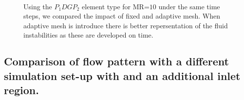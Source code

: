\documentclass[preprint,authoryear,12pt]{elsarticle}
\begin{document}
\begin{figure}
\centering
{}\\[2mm]%
%
\caption{Using the $P_{1}DGP_{2}$ element type for MR=$10$ under the same time steps, we compared the impact of fixed and adaptive mesh. When adaptive mesh is introduce there is better repersentation of the fluid instabilities as these are developed on time.}
\label{fig:2testcase_d}
\end{figure}



\subsection{Comparison of flow pattern with a different simulation set-up with and an additional inlet region.}
\end{document}
